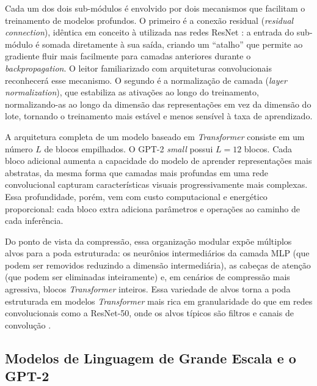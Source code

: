 Cada um dos dois sub-módulos é envolvido por dois mecanismos que facilitam o treinamento
de modelos profundos. O primeiro é a conexão residual (\textit{residual connection}),
idêntica em conceito à utilizada nas redes ResNet \cite{He2016}: a entrada do
sub-módulo é somada diretamente à sua saída, criando um ``atalho'' que permite ao gradiente
fluir mais facilmente para camadas anteriores durante o \textit{backpropagation}. O leitor
familiarizado com arquiteturas convolucionais reconhecerá esse mecanismo. O segundo é a
normalização de camada (\textit{layer normalization}), que estabiliza as ativações ao
longo do treinamento, normalizando-as ao longo da dimensão das representações em vez da
dimensão do lote, tornando o treinamento mais estável e menos sensível à taxa de
aprendizado.

A arquitetura completa de um modelo baseado em \textit{Transformer} consiste em um número
$L$ de blocos empilhados. O GPT-2 \textit{small} possui $L = 12$ blocos. Cada bloco
adicional aumenta a capacidade do modelo de aprender representações mais abstratas, da
mesma forma que camadas mais profundas em uma rede convolucional capturam características
visuais progressivamente mais complexas. Essa profundidade, porém, vem com custo
computacional e energético proporcional: cada bloco extra adiciona parâmetros e operações
ao caminho de cada inferência.

Do ponto de vista da compressão, essa organização modular expõe múltiplos alvos para a
poda estruturada: os neurônios intermediários da camada MLP (que podem ser removidos
reduzindo a dimensão intermediária), as cabeças de atenção (que podem ser eliminadas
inteiramente) e, em cenários de compressão mais agressiva, blocos \textit{Transformer}
inteiros. Essa variedade de alvos torna a poda estruturada em modelos \textit{Transformer}
mais rica em granularidade do que em redes convolucionais como a ResNet-50, onde os
alvos típicos são filtros e canais de convolução \cite{Li2017}.


\subsection{Modelos de Linguagem de Grande Escala e o GPT-2}\label{subsec:llm_gpt2}

